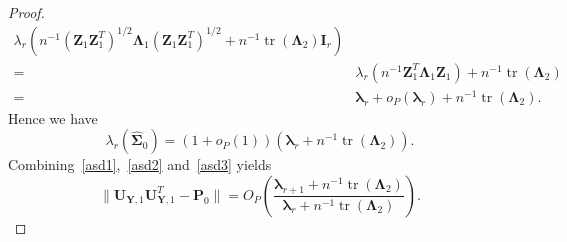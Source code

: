 \documentclass[12pt]{article} %
\DeclareMathOperator{\mytr}{tr}
\newcommand{\bZ}{\mathbf{Z}}
\newcommand{\bP}{\mathbf{P}}
\newcommand{\bY}{\mathbf{Y}}
\newcommand{\bI}{\mathbf{I}}
\newcommand{\bU}{\mathbf{U}}
\newcommand{\bfsym}[1]{\ensuremath{\boldsymbol{#1}}}
\def\blambda {\bfsym {\lambda}}
\def\bLambda {\bfsym {\Lambda}}
\def\bSigma {\bfsym {\Sigma}}
\theoremstyle{definition}
\begin{document}
\begin{appendices}
\begin{proof}
\begin{equation*}
\begin{split}
     \lambda_r\left(
        n^{-1} (\bZ_1\bZ_1^T)^{1/2}
         \bLambda_1 
         (\bZ_1\bZ_1^T)^{1/2}
         +
         n^{-1} \mytr(\bLambda_2)\bI_r 
    \right)
\\
        =&
     \lambda_r\left(
        n^{-1} \bZ_1^T
         \bLambda_1 
         \bZ_1
    \right)
         +
         n^{-1} \mytr(\bLambda_2)
        \\
        =&
        \blambda_r +o_P(\blambda_r)
         +
         n^{-1} \mytr(\bLambda_2).
        \end{split}
    \end{equation*}
    Hence we have 
    \begin{equation}\label{asd3}
    \lambda_r(\hat{\bSigma}_0)=(1+o_P(1))(\blambda_r+n^{-1}\mytr(\bLambda_2)).
    \end{equation}
    Combining~\eqref{asd1},~\eqref{asd2} and~\eqref{asd3} yields
    \begin{equation*}
        \|\bU_{\bY,1}\bU_{\bY,1}^T -\bP_0 \|
        =O_P\left(\frac{\blambda_{r+1}+n^{-1}\mytr(\bLambda_2)}{\blambda_r +n^{-1}\mytr(\bLambda_2)}\right).
    \end{equation*}


\end{proof}
\end{appendices}
\end{document}
